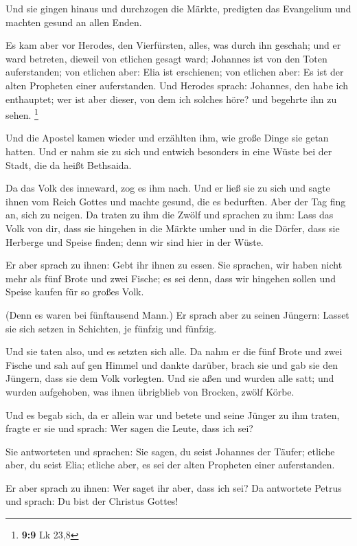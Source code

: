  Und sie gingen hinaus und durchzogen die Märkte, predigten
das Evangelium und machten gesund an allen Enden.

 Es kam aber vor Herodes, den Vierfürsten, alles, was durch
ihn geschah; und er ward betreten, dieweil von etlichen gesagt ward;
Johannes ist von den Toten auferstanden;  von etlichen aber:
Elia ist erschienen; von etlichen aber: Es ist der alten Propheten einer
auferstanden.  Und Herodes sprach: Johannes, den habe ich
enthauptet; wer ist aber dieser, von dem ich solches höre? und begehrte
ihn zu sehen. \footnote{\textbf{9:9} Lk 23,8}

 Und die Apostel kamen wieder und erzählten ihm, wie große
Dinge sie getan hatten. Und er nahm sie zu sich und entwich besonders in
eine Wüste bei der Stadt, die da heißt Bethsaida.

 Da das Volk des inneward, zog es ihm nach. Und er ließ sie
zu sich und sagte ihnen vom Reich Gottes und machte gesund, die es
bedurften. Aber der Tag fing an, sich zu neigen.  Da traten
zu ihm die Zwölf und sprachen zu ihm: Lass das Volk von dir, dass sie
hingehen in die Märkte umher und in die Dörfer, dass sie Herberge und
Speise finden; denn wir sind hier in der Wüste.

 Er aber sprach zu ihnen: Gebt ihr ihnen zu essen. Sie
sprachen, wir haben nicht mehr als fünf Brote und zwei Fische; es sei
denn, dass wir hingehen sollen und Speise kaufen für so großes Volk.

 (Denn es waren bei fünftausend Mann.) Er sprach aber zu
seinen Jüngern: Lasset sie sich setzen in Schichten, je fünfzig und
fünfzig.

 Und sie taten also, und es setzten sich alle.
 Da nahm er die fünf Brote und zwei Fische und sah auf gen
Himmel und dankte darüber, brach sie und gab sie den Jüngern, dass sie
dem Volk vorlegten.  Und sie aßen und wurden alle satt; und
wurden aufgehoben, was ihnen übrigblieb von Brocken, zwölf Körbe.

 Und es begab sich, da er allein war und betete und seine
Jünger zu ihm traten, fragte er sie und sprach: Wer sagen die Leute,
dass ich sei?

 Sie antworteten und sprachen: Sie sagen, du seist Johannes
der Täufer; etliche aber, du seist Elia; etliche aber, es sei der alten
Propheten einer auferstanden.

 Er aber sprach zu ihnen: Wer saget ihr aber, dass ich sei?
Da antwortete Petrus und sprach: Du bist der Christus Gottes!

